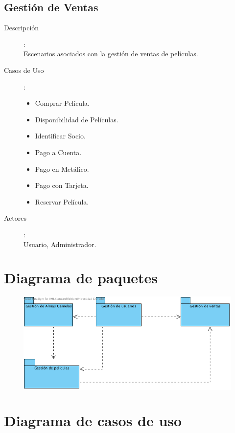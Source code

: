 \documentclass{article}
\begin{document}
\subsection*{Gestión de Ventas}
	\begin{description}
	\item[Descripción]:\\ Escenarios asociados con la gestión de ventas de películas.
	\item[Casos de Uso]:
	\begin{itemize}
		\item Comprar Película. %
		\item Disponibilidad de Películas. %
		\item Identificar Socio.															%
		\item Pago a Cuenta.
		\item Pago en Metálico.
		\item Pago con Tarjeta.
		\item Reservar Película.
	\end{itemize}	
	\item[Actores]:\\ Usuario, Administrador.
	\end{description}
	
\section{Diagrama de paquetes}
	\begin{figure}[h]
		\begin{center}
   			\includegraphics[scale=0.75]{Paquetes.png}
 	  	\end{center}
 	 \end{figure}

\pagebreak

\section{Diagrama de casos de uso}
\end{document}
